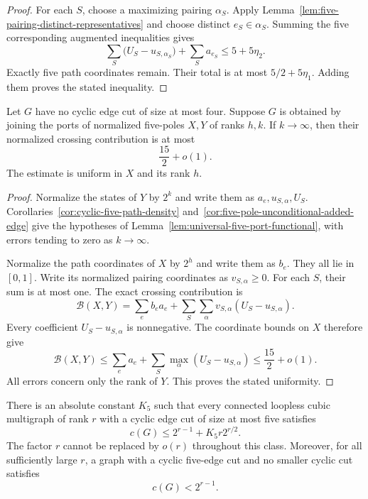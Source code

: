 \begin{proof}
For each $S$, choose a maximizing pairing $\alpha_S$.
Apply Lemma~\ref{lem:five-pairing-distinct-representatives} and choose distinct $e_S\in\alpha_S$.
Summing the five corresponding augmented inequalities gives
\[
 \sum_S\bigl(U_S-u_{S,\alpha_S}\bigr)
 +\sum_S a_{e_S}\le5+5\eta_2.
\]
Exactly five path coordinates remain.
Their total is at most $5/2+5\eta_1$.
Adding them proves the stated inequality.
\end{proof}

\begin{proposition}
\label{prop:five-cut-universal-deficit}
Let $G$ have no cyclic edge cut of size at most four.
Suppose $G$ is obtained by joining the ports of normalized five-poles $X,Y$ of ranks $h,k$.
If $k\to\infty$, then their normalized crossing contribution is at most
\[
 \frac{15}{2}+o(1).
\]
The estimate is uniform in $X$ and its rank $h$.
\end{proposition}

\begin{proof}
Normalize the states of $Y$ by $2^k$ and write them as $a_e,u_{S,\alpha},U_S$.
Corollaries~\ref{cor:cyclic-five-path-density} and~\ref{cor:five-pole-unconditional-added-edge} give the hypotheses of Lemma~\ref{lem:universal-five-port-functional}, with errors tending to zero as $k\to\infty$.

Normalize the path coordinates of $X$ by $2^h$ and write them as $b_e$.
They all lie in $[0,1]$.
Write its normalized pairing coordinates as $v_{S,\alpha}\ge0$.
For each $S$, their sum is at most one.
The exact crossing contribution is
\[
 \mathcal B(X,Y)
 =\sum_e b_ea_e
  +\sum_S\sum_\alpha v_{S,\alpha}
       (U_S-u_{S,\alpha}).
\]
Every coefficient $U_S-u_{S,\alpha}$ is nonnegative.
The coordinate bounds on $X$ therefore give
\[
 \mathcal B(X,Y)
 \le\sum_ea_e+\sum_S\max_\alpha(U_S-u_{S,\alpha})
 \le\frac{15}{2}+o(1).
\]
All errors concern only the rank of $Y$.
This proves the stated uniformity.
\end{proof}

\begin{theorem}
\label{thm:sharp-order-five-cut-error}
There is an absolute constant $K_5$ such that every connected loopless cubic multigraph of rank $r$ with a cyclic edge cut of size at most five satisfies
\[
 c(G)\le2^{r-1}+K_5r2^{r/2}.
\]
The factor $r$ cannot be replaced by $o(r)$ throughout this class.
Moreover, for all sufficiently large $r$, a graph with a cyclic five-edge cut and no smaller cyclic cut satisfies
\[
 c(G)<2^{r-1}.
\]
\end{theorem}

